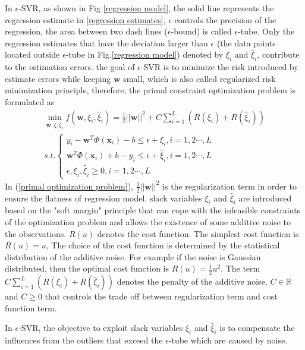  In $\epsilon$-SVR, as shown in Fig \ref{regression model}, the solid line represents the regression estimate in \ref{regression estimates}, $\epsilon$ controls the precision of the regression, the area between two dash lines ($\epsilon$-bound) is called $\epsilon$-tube. Only the regression estimates that have the deviation larger than $\epsilon$ (the data points located outside $\epsilon$-tube in Fig.\ref{regression model}) denoted by $\xi_{i}$ and $\hat{\xi}_{i}$, contribute to the estimation errors.
the goal of $\epsilon$-SVR is to minimize the risk introduced by estimate errors while keeping $\mathbf{w}$ small, which is also called regularized risk minimization principle, therefore, the primal constraint optimization problem is formulated as
\begin{eqnarray}
\nonumber
\min_{\mathbf{w}, \xi, \hat{\xi}_{i}} f(\mathbf{w}, \xi_{i}, \hat{\xi}_{i})=\frac{1}{2}||\mathbf{w}||^{2}+C\sum_{i=1}^{L}(R(\xi_{i})+R(\hat{\xi}_{i}))\\
s.t. \left\{\begin{array}{ll}
y_{i}-\mathbf{w}^{T}\Phi(\mathbf{x}_{i})-b \leq \epsilon+\xi_{i}, i=1,2\cdots, L \\
\mathbf{w}^{T}\Phi(\mathbf{x}_{i})+b-y_{i} \leq \epsilon+\hat{\xi}_{i}, i=1,2\cdots, L\\
\epsilon, \xi_{i},\hat{\xi}_{i} \geq 0, i=1,2\cdots, L
\end{array}\right.
\label{primal optimization problem}
\end{eqnarray} 
In (\ref{primal optimization problem}), $\frac{1}{2}||\mathbf{w}||^{2}$ is the regularization term in order to ensure the flatness of regression model.
 slack variables $\xi_{i}$ and $\hat{\xi}_{i}$ are introduced based on the "soft margin" principle\cite{cortes1995support} that can cope with the infeasible constraints of the optimization problem and allows the existence of some additive noise to the observations. $R(u)$ denotes the cost function. The simplest cost function is $R(u)=u$, The choice of the cost function is determined by the statistical distribution of the additive noise\cite{smola2004tutorial}. For example if the noise is Gaussian distributed, then the optimal cost function is $R(u)=\frac{1}{2}u^{2}$. The term $C\sum_{i=1}^{L}(R(\xi_{i})+R(\hat{\xi}_{i}))$ denotes the penalty of the additive noise, $C\in \mathbb{R}$ and $C\geq 0$ that controls the trade off between regularization term and cost function term.
 
In $\epsilon$-SVR, the objective to exploit slack variables $\xi_{i}$ and $\hat{\xi}_{i}$ is to compensate the influences from the outliers that exceed the $\epsilon$-tube which are caused by noise.


